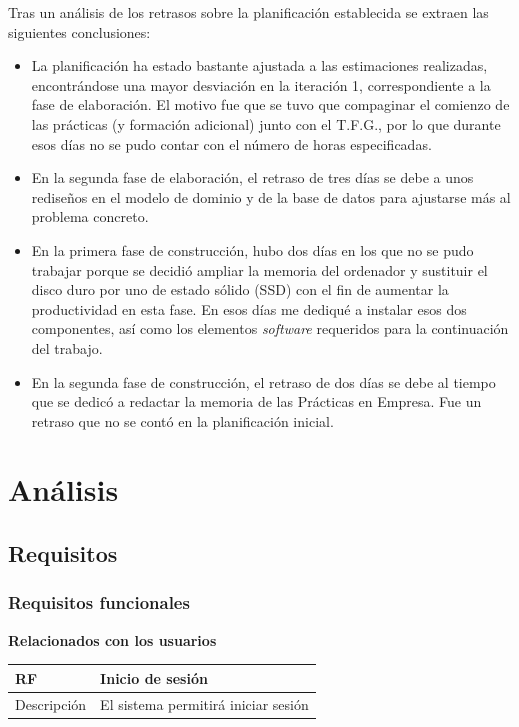\documentclass[twoside]{report}
\newcommand\addrow[2]{#1 &#2\\ }
\newcommand\addheading[2]{#1 &#2\\ \hline}
\newcommand\tabularhead{\begin{tabular}{lp{0.7\textwidth}}
\hline
}
\newenvironment{req}{\tabularhead}
{\hline\end{tabular}}
\begin{document}
Tras un análisis de los retrasos sobre la planificación establecida se extraen las siguientes conclusiones:
\begin{itemize}

\item La planificación ha estado bastante ajustada a las estimaciones realizadas, encontrándose una mayor desviación en la iteración 1, correspondiente a la fase de elaboración. El motivo fue que se tuvo que compaginar el comienzo de las prácticas (y formación adicional) junto con el T.F.G., por lo que durante esos días no se pudo contar con el número de horas especificadas.

\item En la segunda fase de elaboración, el retraso de tres días se debe a unos rediseños en el modelo de dominio y de la base de datos para ajustarse más al problema concreto.

\item En la primera fase de construcción, hubo dos días en los que no se pudo trabajar porque se decidió ampliar la memoria del ordenador y sustituir el disco duro por uno de estado sólido (SSD) con el fin de aumentar la productividad en esta fase. En esos días me dediqué a instalar esos dos componentes, así como los elementos \textit{software} requeridos para la continuación del trabajo.

\item En la segunda fase de construcción, el retraso de dos días se debe al tiempo que se dedicó a redactar la memoria de las Prácticas en Empresa. Fue un retraso que no se contó en la planificación inicial.

\end{itemize}


\section{Análisis}
\subsection{Requisitos}


\subsubsection{Requisitos funcionales}

\textbf{Relacionados con los usuarios}\\

\begin{req}
	\addheading{\textbf{RF\arabic{functionalRequirements}}}{Inicio de sesión}
	\addrow{Descripción}{El sistema permitirá iniciar sesión}
\end{req} \\
\end{document}
